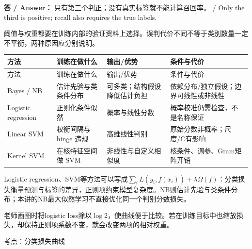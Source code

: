 \textbf{答 / Answer：} 只有第三个判正；没有真实标签就不能计算召回率。 / Only the third is positive; recall also requires the true labels.


阈值与权重都要在训练内部的验证资料上选择。误判代价不同不等于类别数量一定不平衡，两种原因应分别说明。





\begingroup
\small\setlength{\tabcolsep}{3pt}
\renewcommand{\arraystretch}{1.22}
\begin{longtable}{@{}>{\raggedright\arraybackslash}p{}>{\raggedright\arraybackslash}p{}>{\raggedright\arraybackslash}p{}>{\raggedright\arraybackslash}p{}@{}}
\toprule
方法 & 训练在做什么 & 输出/优势 & 条件与代价 \\
\midrule\endfirsthead
方法 & 训练在做什么 & 输出/优势 & 条件与代价 \\
\midrule\endhead
\bottomrule\endfoot
Bayes / NB & 估计先验与类条件分布 & 可多类；结构假设降低估计负担 & 依赖分布/独立假设；边界可线性或非线性 \\
Logistic regression & 正则化条件似然 & 概率与线性分数 & 概率校准仍需检查，不是名称保证 \\
Linear SVM & 权衡间隔与 hinge 违规 & 高维线性判别 & 原始分数非概率；尺度/C有影响 \\
Kernel SVM & 在核特征空间做 SVM & 非线性与自定义相似度 & 核条件、调参、Gram矩阵开销 \\
\end{longtable}
\endgroup


Logistic regression、SVM等方法可以写成\(\sum_i L(y_i,f(x_i))+\lambda\Omega(f)\)：分类损失衡量预测与标签的差异，正则项约束模型复杂度。NB则估计先验与类条件分布；本讲的NB最大似然学习不直接优化同一个判别分数损失。


老师画图时将logistic loss除以\(\log 2\)，使曲线便于比较。若在训练目标中也缩放损失，却保持正则项系数不变，就会改变两项的相对权重。








考点：分类损失曲线

